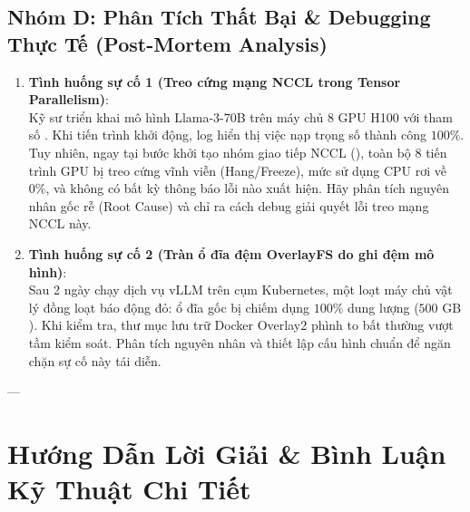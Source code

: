 \subsection{Nhóm D: Phân Tích Thất Bại \& Debugging Thực Tế (Post-Mortem Analysis)}
\begin{enumerate}
  \item \textbf{Tình huống sự cố 1 (Treo cứng mạng NCCL trong Tensor Parallelism)}: \\
  Kỹ sư triển khai mô hình Llama-3-70B trên máy chủ 8 GPU H100 với tham số .
  Khi tiến trình khởi động, log hiển thị việc nạp trọng số thành công $100\%$. Tuy nhiên, ngay tại bước khởi tạo nhóm giao tiếp NCCL (), toàn bộ 8 tiến trình GPU bị treo cứng vĩnh viễn (Hang/Freeze), mức sử dụng CPU rơi về $0\%$, và không có bất kỳ thông báo lỗi nào xuất hiện.
  Hãy phân tích nguyên nhân gốc rễ (Root Cause) và chỉ ra cách debug giải quyết lỗi treo mạng NCCL này.

  \item \textbf{Tình huống sự cố 2 (Tràn ổ đĩa đệm OverlayFS do ghi đệm mô hình)}: \\
  Sau 2 ngày chạy dịch vụ vLLM trên cụm Kubernetes, một loạt máy chủ vật lý đồng loạt báo động đỏ: ổ đĩa gốc \code{/} bị chiếm dụng $100\%$ dung lượng ($500\text{ GB}$). Khi kiểm tra, thư mục lưu trữ Docker Overlay2 phình to bất thường vượt tầm kiểm soát. Phân tích nguyên nhân và thiết lập cấu hình chuẩn để ngăn chặn sự cố này tái diễn.
\end{enumerate}

---

\section{Hướng Dẫn Lời Giải \& Bình Luận Kỹ Thuật Chi Tiết}
\label{sec:ch10-solutions}

